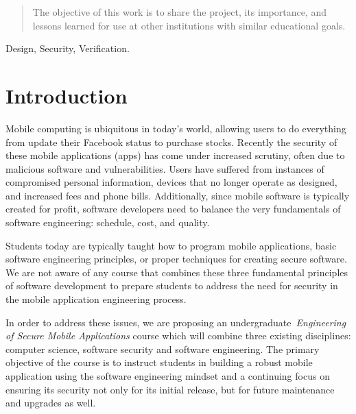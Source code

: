 \documentclass[conference]{IEEEtran}
\begin{document}
\begin{abstract}
The objective of this work is to share the project, its importance, and lessons learned for use at other institutions with similar educational goals. \\




\end{abstract}


\begin{keywords}
Design, Security, Verification.
\end{keywords}







\section{Introduction}
Mobile computing is ubiquitous in today's world, allowing users to do everything from update their Facebook status to purchase stocks. Recently the security of these mobile applications (apps) has come under increased scrutiny, often due to malicious software and vulnerabilities. Users have suffered from instances of compromised personal information, devices that no longer operate as designed, and increased fees and phone bills. Additionally, since mobile software is typically created for profit, software developers need to balance the very fundamentals of software engineering: schedule, cost, and quality.

Students today are typically taught how to program mobile applications, basic software engineering principles, or proper techniques for creating secure software. We are not aware of any course that combines these three fundamental principles of software development to prepare students to address the need for security in the mobile application engineering process.

In order to address these issues, we are proposing an undergraduate~\emph{Engineering of Secure Mobile Applications} course which will combine three existing disciplines: computer science, software security and software engineering. The primary objective of the course is to instruct students in building a robust mobile application using the software engineering mindset and a continuing focus on ensuring its security not only for its initial release, but for future maintenance and upgrades as well.
\end{document}
